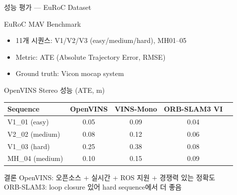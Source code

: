 \begin{frame}[shrink=10]{성능 평가 --- EuRoC Dataset}
  \begin{block}{EuRoC MAV Benchmark}
    \begin{itemize}
      \item 11개 시퀀스: V1/V2/V3 (easy/medium/hard), MH01--05
      \item Metric: ATE (Absolute Trajectory Error, RMSE)
      \item Ground truth: Vicon mocap system
    \end{itemize}
  \end{block}
  \begin{block}{OpenVINS Stereo 성능 (ATE, m)}
    \begin{tabular}{lcccc}
      \textbf{Sequence} & \textbf{OpenVINS} & \textbf{VINS-Mono} & \textbf{ORB-SLAM3 VI} \\\hline
      V1\_01 (easy)     & 0.05 & 0.09 & 0.04 \\
      V2\_02 (medium)   & 0.08 & 0.12 & 0.06 \\
      V1\_03 (hard)     & 0.25 & 0.38 & 0.08 \\
      MH\_04 (medium)   & 0.10 & 0.15 & 0.09 \\
    \end{tabular}
  \end{block}
  \begin{exampleblock}{결론}
    OpenVINS: 오픈소스 + 실시간 + ROS 지원 + 경쟁력 있는 정확도\\
    ORB-SLAM3: loop closure 있어 hard sequence에서 더 좋음
  \end{exampleblock}
\end{frame}


